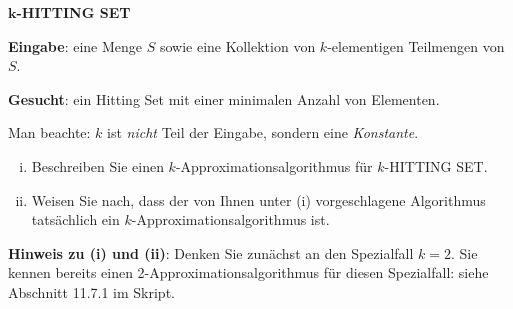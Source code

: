 \documentclass[11pt, a4paper]{article}
\begin{document}
\begin{enumerate}[\bfseries A:]
\begin{enumerate}[\bfseries 1.]
\begin{enumerate}[a)]
\medskip
\begin{center}
\begin{minipage}{0.85\textwidth}
\textbf{$\mathbf{k}$-HITTING SET}

\medskip
\textbf{Eingabe}: eine Menge $S$ sowie eine Kollektion von $k$-elementigen Teilmengen von $S$.

\medskip
\textbf{Gesucht}: ein Hitting Set mit einer minimalen Anzahl von Elementen.
\end{minipage}
\end{center}

\medskip
Man beachte: $k$ ist \textit{nicht} Teil der Eingabe, sondern eine \textit{Konstante}.


\begin{enumerate}[(i)]
\item Beschreiben Sie einen $k$-Approximationsalgorithmus für $k$-HITTING SET.

\item Weisen Sie nach, dass der von Ihnen unter (i) vorgeschlagene Algorithmus tatsächlich ein $k$-Approximationsalgorithmus ist.
\end{enumerate}

\textbf{Hinweis zu (i) und (ii)}: Denken Sie zunächst an den Spezialfall $k=2$. Sie kennen bereits einen 2-Approximationsalgorithmus für diesen Spezialfall: siehe Abschnitt 11.7.1 im Skript.

\end{enumerate}




\end{enumerate}

\end{enumerate}
\end{document}
